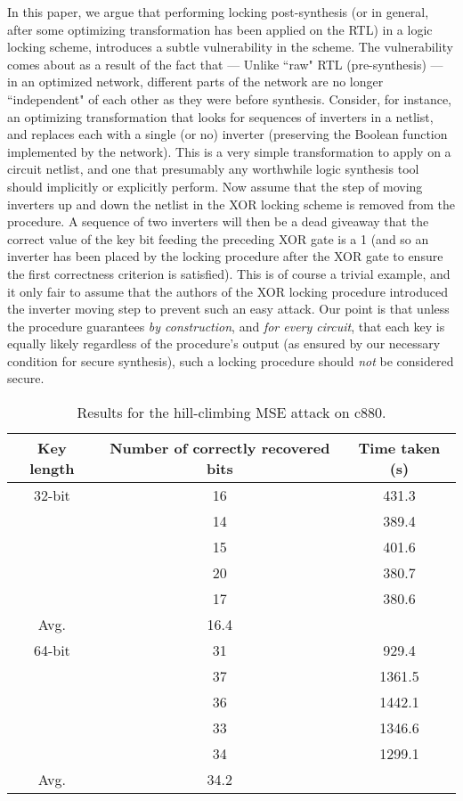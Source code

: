 In this paper, we argue that performing locking post-synthesis (or in general, after some optimizing transformation has been applied on the RTL) in a logic locking scheme, introduces a subtle vulnerability in the scheme. The vulnerability comes about as a result of the fact that --- Unlike ``raw" RTL (pre-synthesis) --- in an optimized network, different parts of the network are no longer ``independent" of each other as they were before synthesis. Consider, for instance, an optimizing transformation that looks for sequences of inverters in a netlist, and replaces each with a single (or no) inverter (preserving the Boolean function implemented by the network). This is a very simple transformation to apply on a circuit netlist, and one that presumably any worthwhile logic synthesis tool should implicitly or explicitly perform. Now assume that the step of moving inverters up and down the netlist in the XOR locking scheme is removed from the procedure. A sequence of two inverters will then be a dead giveaway that the correct value of the key bit feeding the preceding XOR gate is a 1 (and so an inverter has been placed by the locking procedure after the XOR gate to ensure the first correctness criterion is satisfied). This is of course a trivial example, and it only fair to assume that the authors of the XOR locking procedure introduced the inverter moving step to prevent such an easy attack. Our point is that unless the procedure guarantees \emph{by construction}, and \emph{for every circuit}, that each key is equally likely regardless of the procedure's output (as ensured by our necessary condition for secure synthesis), such a locking procedure should \emph{not} be considered secure.

\begin{table*}
\caption{Results for the hill-climbing MSE attack on c880. }
\begin{tabular}{ | c | c | c | }
\hline
Key length & Number of correctly recovered bits & Time taken (s) \\
\hline
32-bit & 16 & 431.3 \\
& 14 & 389.4\\
& 15 & 401.6\\
& 20 & 380.7\\
& 17 & 380.6\\
Avg. & 16.4 &\\
\hline
64-bit & 31 & 929.4\\
& 37 & 1361.5\\
& 36 & 1442.1\\
& 33 & 1346.6\\
& 34 & 1299.1\\
Avg. & 34.2 & \\
\hline
\end{tabular}
\end{table*}

